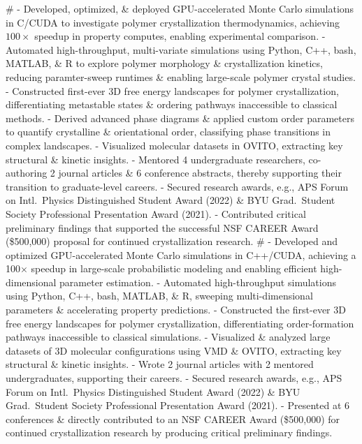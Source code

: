 #
- Developed, optimized, \& deployed GPU-accelerated Monte Carlo simulations in C/CUDA to investigate polymer crystallization thermodynamics, achieving $100\times$ speedup in property computes, enabling experimental comparison.
- Automated high-throughput, multi-variate simulations using Python, C++, bash, MATLAB, \& R to explore polymer morphology \& crystallization kinetics, reducing paramter-sweep runtimes \& enabling large-scale polymer crystal studies.%
- Constructed first-ever 3D free energy landscapes for polymer crystallization, differentiating metastable states \& ordering pathways inaccessible to classical methods.%
- Derived advanced phase diagrams \& applied custom order parameters to quantify crystalline \& orientational order, classifying phase transitions in complex landscapes.
- Visualized molecular datasets in OVITO, extracting key structural \& kinetic insights.
- Mentored 4 undergraduate researchers, co-authoring 2 journal articles \& 6 conference abstracts, thereby supporting their transition to graduate-level careers.
- Secured research awards, e.g., APS Forum on Intl.~Physics Distinguished Student Award (2022) \& BYU Grad.~Student Society Professional Presentation Award (2021).
- Contributed critical preliminary findings that supported the successful NSF CAREER Award (\$500,000) proposal for continued crystallization research.
#
- Developed and optimized GPU-accelerated Monte Carlo simulations in C++/CUDA, achieving a 100$\times$ speedup in large-scale probabilistic modeling and enabling efficient high-dimensional parameter estimation.
- Automated high-throughput simulations using Python, C++, bash, MATLAB, \& R, sweeping multi-dimensional parameters \& accelerating property predictions.
- Constructed the first-ever 3D free energy landscapes for polymer crystallization, differentiating order-formation pathways inaccessible to classical simulations.%
- Visualized \& analyzed large datasets of 3D molecular configurations using VMD \& OVITO, extracting key structural \& kinetic insights.
- Wrote 2 journal articles with 2 mentored undergraduates, supporting their careers.
- Secured research awards, e.g., APS Forum on Intl.~Physics Distinguished Student Award (2022) \& BYU Grad.~Student Society Professional Presentation Award (2021).
- Presented at 6 conferences \& directly contributed to an NSF CAREER Award (\$500,000) for continued crystallization research by producing critical preliminary findings.

